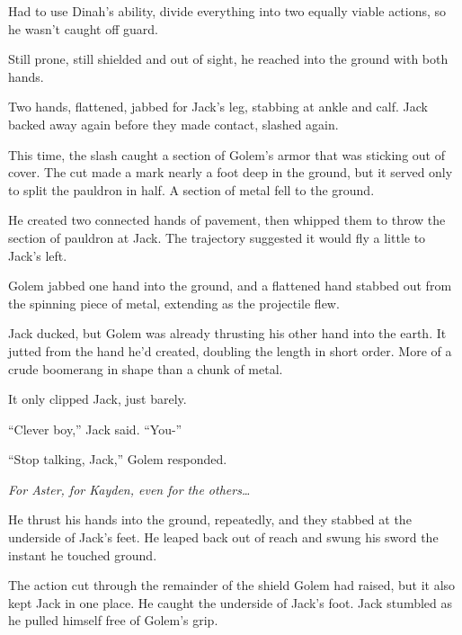 Had to use Dinah's ability, divide everything into two equally viable actions, so he wasn't caught off guard.



Still prone, still shielded and out of sight, he reached into the ground with both hands.



Two hands, flattened, jabbed for Jack's leg, stabbing at ankle and calf.  Jack backed away again before they made contact, slashed again.



This time, the slash caught a section of Golem's armor that was sticking out of cover.  The cut made a mark nearly a foot deep in the ground, but it served only to split the pauldron in half.  A section of metal fell to the ground.



He created two connected hands of pavement, then whipped them to throw the section of pauldron at Jack.  The trajectory suggested it would fly a little to Jack's left.



Golem jabbed one hand into the ground, and a flattened hand stabbed out from the spinning piece of metal, extending as the projectile flew.



Jack ducked, but Golem was already thrusting his other hand into the earth.  It jutted from the hand he'd created, doubling the length in short order.  More of a crude boomerang in shape than a chunk of metal.



It only clipped Jack, just barely.



``Clever boy,'' Jack said.  ``You-''



``Stop talking, Jack,'' Golem responded.



\emph{For Aster, for Kayden, even for the others\ldots}



He thrust his hands into the ground, repeatedly, and they stabbed at the underside of Jack's feet.  He leaped back out of reach and swung his sword the instant he touched ground.



The action cut through the remainder of the shield Golem had raised, but it also kept Jack in one place.  He caught the underside of Jack's foot.  Jack stumbled as he pulled himself free of Golem's grip.



